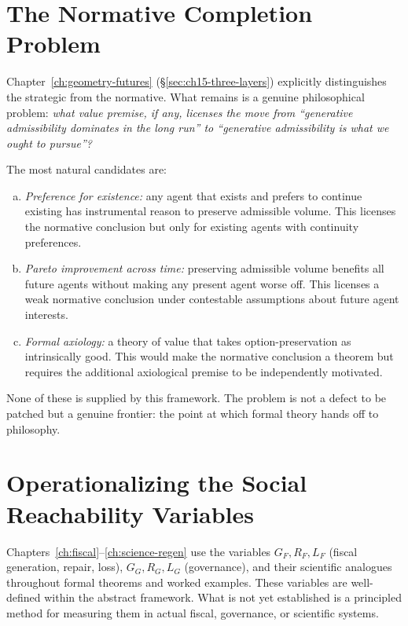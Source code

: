 \documentclass[12pt,twoside,openright]{book}
\begin{document}
\section{The Normative Completion Problem}

Chapter~\ref{ch:geometry-futures} (§\ref{sec:ch15-three-layers})
explicitly distinguishes the strategic from the normative.
What remains is a genuine philosophical problem:
\emph{what value premise, if any, licenses the move from
``generative admissibility dominates in the long run'' to
``generative admissibility is what we ought to pursue''?}

The most natural candidates are:
\begin{enumerate}[(a)]
  \item \emph{Preference for existence:} any agent that
        exists and prefers to continue existing has
        instrumental reason to preserve admissible volume.
        This licenses the normative conclusion but only
        for existing agents with continuity preferences.
  \item \emph{Pareto improvement across time:} preserving
        admissible volume benefits all future agents
        without making any present agent worse off. This
        licenses a weak normative conclusion under
        contestable assumptions about future agent
        interests.
  \item \emph{Formal axiology:} a theory of value that
        takes option-preservation as intrinsically good.
        This would make the normative conclusion a theorem
        but requires the additional axiological premise to
        be independently motivated.
\end{enumerate}
None of these is supplied by this framework. The problem
is not a defect to be patched but a genuine frontier: the
point at which formal theory hands off to philosophy.

\section{Operationalizing the Social Reachability Variables}

Chapters~\ref{ch:fiscal}--\ref{ch:science-regen} use the
variables $G_F, R_F, L_F$ (fiscal generation, repair, loss),
$G_G, R_G, L_G$ (governance), and their scientific analogues
throughout formal theorems and worked examples. These variables
are well-defined within the abstract framework. What is not
yet established is a principled method for measuring them
in actual fiscal, governance, or scientific systems.
\end{document}
